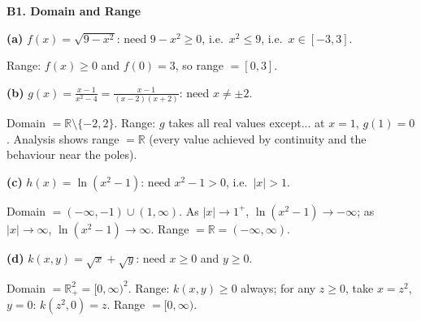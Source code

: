 \documentclass[12pt, a4paper]{article}
\theoremstyle{definition}
\newcommand{\R}{\mathbb{R}}
\begin{document}
\begin{solbox}
\textbf{B1. Domain and Range}

\textbf{(a)} $f(x)=\sqrt{9-x^2}$: need $9-x^2\geq 0$, i.e.\ $x^2\leq 9$, i.e.\ $x\in[-3,3]$.

Range: $f(x)\geq 0$ and $f(0)=3$, so range $=[0,3]$.

\textbf{(b)} $g(x)=\frac{x-1}{x^2-4}=\frac{x-1}{(x-2)(x+2)}$: need $x\neq\pm 2$.

Domain $= \R\setminus\{-2,2\}$. Range: $g$ takes all real values except... at $x=1$, $g(1)=0$. Analysis shows range $=\R$ (every value achieved by continuity and the behaviour near the poles).

\textbf{(c)} $h(x)=\ln(x^2-1)$: need $x^2-1>0$, i.e.\ $|x|>1$.

Domain $=(-\infty,-1)\cup(1,\infty)$. As $|x|\to 1^+$, $\ln(x^2-1)\to-\infty$; as $|x|\to\infty$, $\ln(x^2-1)\to\infty$. Range $=\R=(-\infty,\infty)$.

\textbf{(d)} $k(x,y)=\sqrt{x}+\sqrt{y}$: need $x\geq 0$ and $y\geq 0$.

Domain $= \R^2_+ = [0,\infty)^2$. Range: $k(x,y)\geq 0$ always; for any $z\geq 0$, take $x=z^2$, $y=0$: $k(z^2,0)=z$. Range $=[0,\infty)$.
\end{solbox}
\end{document}
